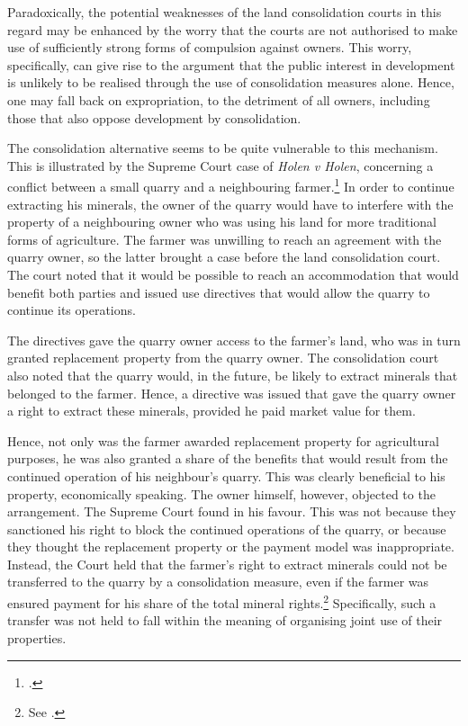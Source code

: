 Paradoxically, the potential weaknesses of the land consolidation courts in this regard may be enhanced by the worry that the courts are not authorised to make use of sufficiently strong forms of compulsion against owners. This worry, specifically, can give rise to the argument that the public interest in development is unlikely to be realised through the use of consolidation measures alone. Hence, one may fall back on expropriation, to the detriment of all owners, including those that also oppose development by consolidation.

The consolidation alternative seems to be quite vulnerable to this mechanism. This is illustrated by the Supreme Court case of {\it Holen v Holen}, concerning a conflict between a small quarry and a neighbouring farmer.\footcite{holen95} In order to continue extracting his minerals, the owner of the quarry would have to interfere with the property of a neighbouring owner who was using his land for more traditional forms of agriculture. The farmer was unwilling to reach an agreement with the quarry owner, so the latter brought a case before the land consolidation court. The court noted that it would be possible to reach an accommodation that would benefit both parties and issued use directives that would allow the quarry to continue its operations.

The directives gave the quarry owner access to the farmer's land, who was in turn granted replacement property from the quarry owner. The consolidation court also noted that the quarry would, in the future, be likely to extract minerals that belonged to the farmer. Hence, a directive was issued that gave the quarry owner a right to extract these minerals, provided he paid market value for them. 

Hence, not only was the farmer awarded replacement property for agricultural purposes, he was also granted a share of the benefits that would result from the continued operation of his neighbour's quarry. This was clearly beneficial to his property, economically speaking. The owner himself, however, objected to the arrangement. The Supreme Court found in his favour. This was not because they sanctioned his right to block the continued operations of the quarry, or because they thought the replacement property or the payment model was inappropriate. Instead, the Court held that the farmer's  right to extract minerals could not be transferred to the quarry by a consolidation measure, even if the farmer was ensured payment for his share of the total mineral rights.\footnote{See \cite[1481]{holen95}.} Specifically, such a transfer was not held to fall within the meaning of organising joint use of their properties. 

